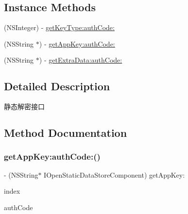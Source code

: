 \subsection*{Instance Methods}
\begin{DoxyCompactItemize}
\item 
(N\+S\+Integer) -\/ \mbox{\hyperlink{protocol_i_open_static_data_store_component_01-p_a1822b2ea73835a2d1495288a785c967c}{get\+Key\+Type\+:auth\+Code\+:}}
\item 
(N\+S\+String $\ast$) -\/ \mbox{\hyperlink{protocol_i_open_static_data_store_component_01-p_a13987ea2e859db26b83f156b2da8e82a}{get\+App\+Key\+:auth\+Code\+:}}
\item 
(N\+S\+String $\ast$) -\/ \mbox{\hyperlink{protocol_i_open_static_data_store_component_01-p_a5221869990c818eda3489e48dd2aa837}{get\+Extra\+Data\+:auth\+Code\+:}}
\end{DoxyCompactItemize}


\subsection{Detailed Description}
静态解密接口 

\subsection{Method Documentation}
\mbox{\label{protocol_i_open_static_data_store_component_01-p_a13987ea2e859db26b83f156b2da8e82a}} 
\subsubsection{\texorpdfstring{get\+App\+Key\+:auth\+Code\+:()}{getAppKey:authCode:()}}
{\footnotesize\ttfamily -\/ (N\+S\+String$\ast$ I\+Open\+Static\+Data\+Store\+Component) get\+App\+Key\+: \begin{DoxyParamCaption}\item[{(N\+S\+Number $\ast$)}]{index }\item[{authCode:(N\+S\+String $\ast$)}]{auth\+Code }\end{DoxyParamCaption}}

